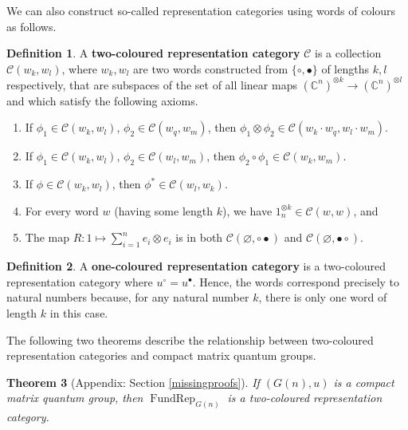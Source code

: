 \documentclass{article}
\DeclareMathOperator{\FundRep}{FundRep}
\theoremstyle{plain}
\newtheorem{theorem}{Theorem}[section]
\theoremstyle{definition}
\newtheorem{definition}[theorem]{Definition}
\theoremstyle{remark}
\begin{document}
We can also construct so-called representation categories using words of colours as follows.
\begin{definition} \label{twocolourrepcat}
	A \textbf{two-coloured representation category} $\mathcal{C}$ 
	is a collection 
	$\mathcal{C}(w_k, w_l)$, where $w_k, w_l$ are two words constructed from 
	$\{\circ, \bullet\}$ 
	of lengths $k, l$ respectively, 
	that are subspaces of the set of all linear maps 
	$(\mathbb{C}^n)^{\otimes k} \rightarrow (\mathbb{C}^n)^{\otimes l}$ and which satisfy
	the following axioms.

	\begin{enumerate}
		\item If $\phi_1 \in \mathcal{C}(w_k, w_l)$, 
			$\phi_2 \in \mathcal{C}(w_q, w_m)$,
			then $\phi_1 \otimes \phi_2 \in \mathcal{C}(w_k \cdot w_q, w_l \cdot w_m)$.
		\item If $\phi_1 \in \mathcal{C}(w_k, w_l)$, 
			$\phi_2 \in \mathcal{C}(w_l, w_m)$,
			then $\phi_2 \circ \phi_1 \in \mathcal{C}(w_k, w_m)$.
		\item If $\phi \in \mathcal{C}(w_k, w_l)$, 
			then $\phi^{*} \in \mathcal{C}(w_l, w_k)$.
		\item For every word $w$ (having some length $k$), we have $1_n^{\otimes k} \in \mathcal{C}(w, w)$, and
		\item The map $R : 1 \mapsto \sum_{i=1}^{n} e_i \otimes e_i$
			is in both 
			$\mathcal{C}(\varnothing, \circ\bullet)$ 
			and
			$\mathcal{C}(\varnothing, \bullet\circ)$.
	\end{enumerate}
\end{definition}

\begin{definition} \label{onecolouredrep}
	A \textbf{one-coloured representation category} is a two-coloured representation category where $u^{\circ} = u^{\bullet}$.
	Hence, the words correspond precisely to natural numbers
	because, for any natural number $k$, there is only one word of length $k$
	in this case.
\end{definition}

The following two theorems describe the relationship between two-coloured representation categories and compact matrix quantum groups.


\begin{theorem}[Appendix: Section \ref{missingproofs}]
	\label{cmqgtwocoloured}
	If $(G(n),u)$ is a compact matrix quantum group, 
	then $\FundRep_{G(n)}$ is a two-coloured representation category.
\end{theorem}
\end{document}

